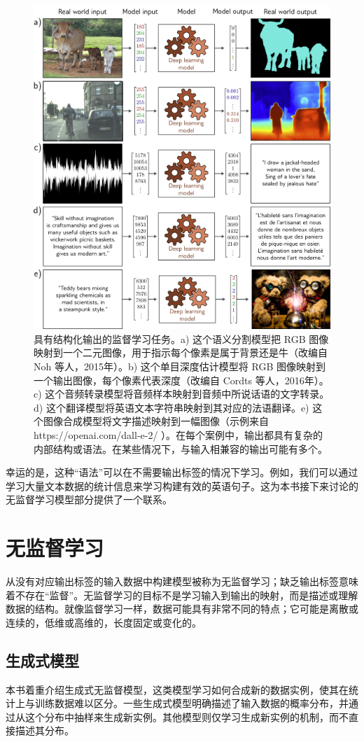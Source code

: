\begin{figure}
	\centering
	\includegraphics[width=0.7\linewidth]{png/chapter1/IntroModels2a}
	\caption{具有结构化输出的监督学习任务。a) 这个语义分割模型把 RGB 图像映射到一个二元图像，用于指示每个像素是属于背景还是牛（改编自 Noh 等人，2015年）。b) 这个单目深度估计模型将 RGB 图像映射到一个输出图像，每个像素代表深度（改编自 Cordts 等人，2016年）。c) 这个音频转录模型将音频样本映射到音频中所说话语的文字转录。d) 这个翻译模型将英语文本字符串映射到其对应的法语翻译。e) 这个图像合成模型将文字描述映射到一幅图像（示例来自 https://openai.com/dall-e-2/ ）。在每个案例中，输出都具有复杂的内部结构或语法。在某些情况下，与输入相兼容的输出可能有多个。}
\end{figure}


幸运的是，这种“语法”可以在不需要输出标签的情况下学习。例如，我们可以通过学习大量文本数据的统计信息来学习构建有效的英语句子。这为本书接下来讨论的无监督学习模型部分提供了一个联系。

\section{无监督学习}
从没有对应输出标签的输入数据中构建模型被称为无监督学习；缺乏输出标签意味着不存在“监督”。无监督学习的目标不是学习输入到输出的映射，而是描述或理解数据的结构。就像监督学习一样，数据可能具有非常不同的特点；它可能是离散或连续的，低维或高维的，长度固定或变化的。

\subsection{生成式模型}
本书着重介绍生成式无监督模型，这类模型学习如何合成新的数据实例，使其在统计上与训练数据难以区分。一些生成式模型明确描述了输入数据的概率分布，并通过从这个分布中抽样来生成新实例。其他模型则仅学习生成新实例的机制，而不直接描述其分布。


